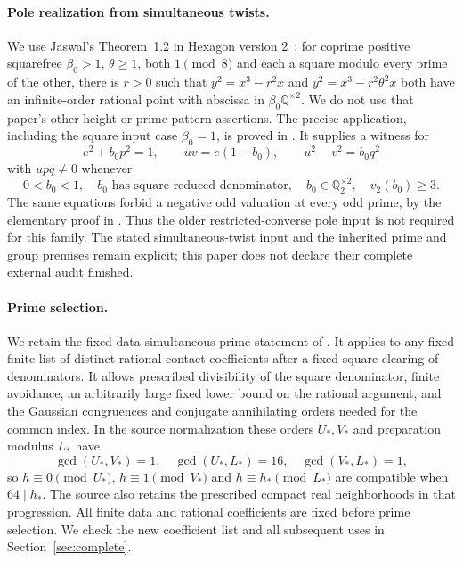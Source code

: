 \documentclass[11pt,a4paper]{article}
\newcommand{\Q}{\mathbb Q}\newcommand{\Z}{\mathbb Z}\DeclareMathOperator{\Tr}{Tr}\DeclareMathOperator{\Nm}{Nm}\DeclareMathOperator{\rad}{rad}
\begin{document}
\paragraph{Pole realization from simultaneous twists.}
We use Jaswal's Theorem~1.2 in Hexagon version 2~\cite{Jaswal}: for
coprime positive squarefree $\beta_0>1$, $\theta\ge1$, both
$1\pmod8$ and each a square modulo every prime of the other, there
is $r>0$ such that $y^2=x^3-r^2x$ and
$y^2=x^3-r^2\theta^2x$ both have an infinite-order rational point
with abscissa in $\beta_0\Q^{\times2}$. We do not use that paper's
other height or prime-pattern assertions. The precise application,
including the square input case $\beta_0=1$, is proved in \cite{Pole}.
It supplies a witness for
\[
 e^2+b_0p^2=1,\qquad uv=e(1-b_0),\qquad u^2-v^2=b_0q^2
\]
with $upq\ne0$ whenever
\begin{equation}\label{eq:prepared}
 0<b_0<1,\quad b_0\text{ has square reduced denominator},\quad
 b_0\in\Q_2^{\times2},\quad v_2(b_0)\ge3.
\end{equation}
The same equations forbid a negative odd valuation at every odd prime,
by the elementary proof in \cite{Pole}. Thus the older restricted-converse
pole input is not required for this family. The stated simultaneous-twist
input and the inherited prime and group premises remain explicit;
this paper does not declare their complete external audit finished.

\paragraph{Prime selection.}
We retain the fixed-data simultaneous-prime statement of
\cite{Dependencies,Selection}. It applies to any fixed finite list
of distinct rational contact coefficients after a fixed square
clearing of denominators. It allows prescribed divisibility of the
square denominator, finite avoidance, an arbitrarily large fixed
lower bound on the rational argument, and the Gaussian congruences
and conjugate annihilating orders needed for the common index.
In the source normalization these orders $U_*,V_*$ and preparation
modulus $L_*$ have
\[
\gcd(U_*,V_*)=1,\quad\gcd(U_*,L_*)=16,\quad\gcd(V_*,L_*)=1,
\]
so $h\equiv0\pmod{U_*}$, $h\equiv1\pmod{V_*}$ and
$h\equiv h_*\pmod{L_*}$ are compatible when $64\mid h_*$.
The source also retains the prescribed compact real neighborhoods
in that progression. All finite data and rational coefficients are
fixed before prime selection. We check the new coefficient list and
all subsequent uses in Section~\ref{sec:complete}.
\end{document}
